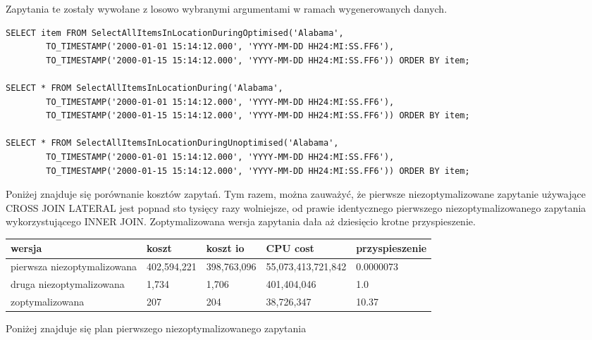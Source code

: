 \documentclass[11pt]{article}
\numberwithin{figure}{subsection}
\begin{document}
		Zapytania te zostały wywołane z losowo wybranymi argumentami w ramach
		wygenerowanych danych. \\
		
		\begin{lstlisting}[caption={Wywołanie zapytań}, captionpos=b]
SELECT item FROM SelectAllItemsInLocationDuringOptimised('Alabama',
		TO_TIMESTAMP('2000-01-01 15:14:12.000', 'YYYY-MM-DD HH24:MI:SS.FF6'),
		TO_TIMESTAMP('2000-01-15 15:14:12.000', 'YYYY-MM-DD HH24:MI:SS.FF6')) ORDER BY item;

SELECT * FROM SelectAllItemsInLocationDuring('Alabama',
		TO_TIMESTAMP('2000-01-01 15:14:12.000', 'YYYY-MM-DD HH24:MI:SS.FF6'),
		TO_TIMESTAMP('2000-01-15 15:14:12.000', 'YYYY-MM-DD HH24:MI:SS.FF6')) ORDER BY item;

SELECT * FROM SelectAllItemsInLocationDuringUnoptimised('Alabama',
		TO_TIMESTAMP('2000-01-01 15:14:12.000', 'YYYY-MM-DD HH24:MI:SS.FF6'),
		TO_TIMESTAMP('2000-01-15 15:14:12.000', 'YYYY-MM-DD HH24:MI:SS.FF6')) ORDER BY item;
		\end{lstlisting}
		
		Poniżej znajduje się porównanie kosztów zapytań. Tym razem, można
		zauważyć, że pierwsze niezoptymalizowane zapytanie używające CROSS JOIN
		LATERAL jest popnad sto tysięcy razy wolniejsze, od prawie identycznego
		pierwszego niezoptymalizowanego zapytania wykorzystującego INNER JOIN.
		Zoptymalizowana wersja zapytania dała aż dziesięcio krotne
		przyspieszenie.
		\\
		
		\begin{tabularx}{\textwidth}{|X|X|X|X|X|}
			\hline
			wersja & koszt & koszt io & CPU cost & przyspieszenie \\
			\hline
			pierwsza niezoptymalizowana & 402,594,221 & 398,763,096 &
			55,073,413,721,842 & 0.0000073 \\
			\hline
			druga niezoptymalizowana & 1,734 & 1,706 & 401,404,046 & 1.0 \\
			\hline
			zoptymalizowana & 207 & 204 & 38,726,347 & 10.37 \\
			\hline
		\end{tabularx}
		
		Poniżej znajduje się plan pierwszego niezoptymalizowanego zapytania \\
		
\end{document}
